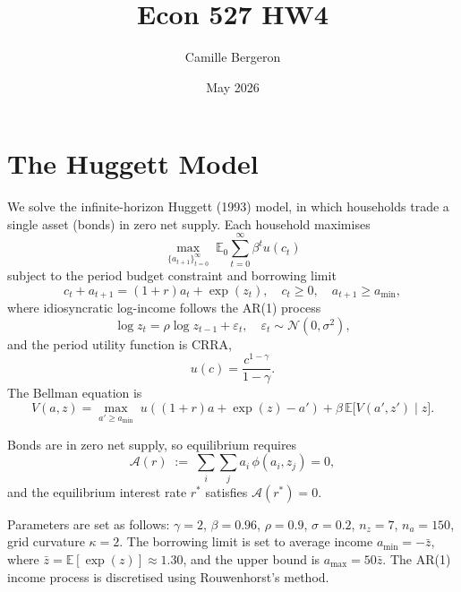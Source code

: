 \documentclass{article}
\title{Econ 527 HW4}
\author{Camille Bergeron}
\date{May 2026}
\begin{document}
\maketitle

\section{The Huggett Model}

We solve the infinite-horizon Huggett (1993) model, in which households trade a
single asset (bonds) in zero net supply. Each household maximises
\begin{equation*}
    \max_{\{a_{t+1}\}_{t=0}^{\infty}} \; \mathbb{E}_0 \sum_{t=0}^{\infty} \beta^t u(c_t)
\end{equation*}
subject to the period budget constraint and borrowing limit
\begin{equation*}
    c_t + a_{t+1} = (1+r)a_t + \exp(z_t), \quad c_t \geq 0, \quad a_{t+1} \geq a_{\min},
\end{equation*}
where idiosyncratic log-income follows the AR(1) process
\begin{equation*}
    \log z_t = \rho \log z_{t-1} + \varepsilon_t, \quad \varepsilon_t \sim \mathcal{N}(0,\sigma^2),
\end{equation*}
and the period utility function is CRRA,
\begin{equation*}
    u(c) = \frac{c^{1-\gamma}}{1-\gamma}.
\end{equation*}
The Bellman equation is
\begin{equation}\label{eq:bellman}
    V(a,z) = \max_{a' \geq a_{\min}} \; u\!\left((1+r)a + \exp(z) - a'\right) + \beta\,\mathbb{E}\bigl[V(a',z')\mid z\bigr].
\end{equation}

Bonds are in zero net supply, so equilibrium requires
\begin{equation*}
    \mathcal{A}(r) \;:=\; \sum_{i}\sum_{j} a_i\,\phi(a_i,z_j) = 0,
\end{equation*}
and the equilibrium interest rate $r^*$ satisfies $\mathcal{A}(r^*)=0$.

Parameters are set as follows: $\gamma = 2$, $\beta = 0.96$, $\rho = 0.9$,
$\sigma = 0.2$, $n_z = 7$, $n_a = 150$, grid curvature $\kappa = 2$.
The borrowing limit is set to average income $a_{\min} = -\bar{z}$, where
$\bar{z} = \mathbb{E}[\exp(z)] \approx 1.30$, and the upper bound is
$a_{\max} = 50\bar{z}$. The AR(1) income process is discretised using
Rouwenhorst's method.
\end{document}
